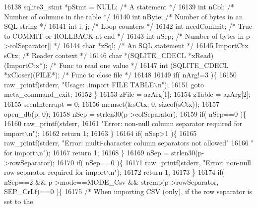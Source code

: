 \begin{DoxyCode}
{{{{{{{{{{{{{{{{{{{{{{{16138     sqlite3_stmt *pStmt = NULL; \textcolor{comment}{/* A statement */}
16139     \textcolor{keywordtype}{int} nCol;                   \textcolor{comment}{/* Number of columns in the table */}
16140     \textcolor{keywordtype}{int} nByte;                  \textcolor{comment}{/* Number of bytes in an SQL string */}
16141     \textcolor{keywordtype}{int} i, j;                   \textcolor{comment}{/* Loop counters */}
16142     \textcolor{keywordtype}{int} needCommit;             \textcolor{comment}{/* True to COMMIT or ROLLBACK at end */}
16143     \textcolor{keywordtype}{int} nSep;                   \textcolor{comment}{/* Number of bytes in p->colSeparator[] */}
16144     \textcolor{keywordtype}{char} *zSql;                 \textcolor{comment}{/* An SQL statement */}
16145     ImportCtx sCtx;             \textcolor{comment}{/* Reader context */}
16146     \textcolor{keywordtype}{char} *(SQLITE_CDECL *xRead)(ImportCtx*); \textcolor{comment}{/* Func to read one value */}
16147     int (SQLITE_CDECL *xCloser)(FILE*);      \textcolor{comment}{/* Func to close file */}
16148 
16149     \textcolor{keywordflow}{if}( nArg!=3 )\{
16150       raw_printf(stderr, \textcolor{stringliteral}{"Usage: .import FILE TABLE\(\backslash\)n"});
16151       \textcolor{keywordflow}{goto} meta\_command\_exit;
16152     \}
16153     zFile = azArg[1];
16154     zTable = azArg[2];
16155     seenInterrupt = 0;
16156     memset(&sCtx, 0, \textcolor{keyword}{sizeof}(sCtx));
16157     open_db(p, 0);
16158     nSep = strlen30(p->colSeparator);
16159     \textcolor{keywordflow}{if}( nSep==0 )\{
16160       raw_printf(stderr,
16161                  \textcolor{stringliteral}{"Error: non-null column separator required for import\(\backslash\)n"});
16162       \textcolor{keywordflow}{return} 1;
16163     \}
16164     \textcolor{keywordflow}{if}( nSep>1 )\{
16165       raw_printf(stderr, \textcolor{stringliteral}{"Error: multi-character column separators not allowed"}
16166                       \textcolor{stringliteral}{" for import\(\backslash\)n"});
16167       \textcolor{keywordflow}{return} 1;
16168     \}
16169     nSep = strlen30(p->rowSeparator);
16170     \textcolor{keywordflow}{if}( nSep==0 )\{
16171       raw_printf(stderr, \textcolor{stringliteral}{"Error: non-null row separator required for import\(\backslash\)n"});
16172       \textcolor{keywordflow}{return} 1;
16173     \}
16174     \textcolor{keywordflow}{if}( nSep==2 && p->mode==MODE_Csv && strcmp(p->rowSeparator, SEP_CrLf)==0 )\{
16175       \textcolor{comment}{/* When importing CSV (only), if the row separator is set to the}
}}}}}}}}}}}}}}}}}}}}}}}
\end{DoxyCode}
